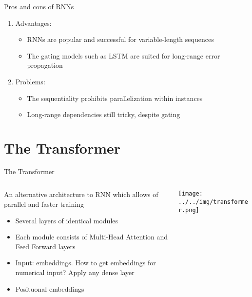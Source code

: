 \documentclass[usenames,dvipsnames,handout,aspectratio=169]{beamer}
\begin{document}
\begin{frame}{Pros and cons of RNNs}

\begin{enumerate}
\item Advantages: 
\begin{itemize} 
\item RNNs are popular and successful for variable-length sequences
\item The gating models such as LSTM are suited for long-range error propagation
\end{itemize}

\item Problems: 
\begin{itemize}
\item The sequentiality prohibits parallelization within instances
\item Long-range dependencies still tricky, despite gating 
\end{itemize}

\end{enumerate}

\end{frame}

\section{The Transformer}


\begin{frame}{The Transformer}	
\begin{columns}
\begin{column}{0.6\textwidth}

An alternative architecture to RNN which allows of parallel and faster training

\begin{itemize}
	
\item Several layers of identical modules
\item Each module consists of Multi-Head Attention and Feed Forward layers
\item Input: embeddings. How to get embeddings for numerical input? Apply any dense layer
\item Posituonal embeddings
\end{itemize}

\end{column}
\begin{column}{0.4\textwidth}  %
    \begin{center}
	\texttt{[image: ../../img/transformer.png]}
     \end{center}
\end{column}
\end{columns}
\end{frame}
\end{document}
